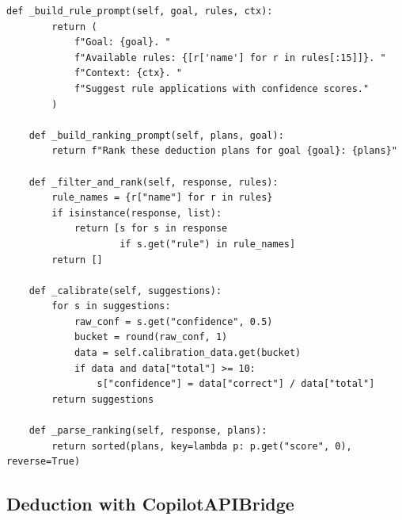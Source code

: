 \documentclass[11pt]{article}
\begin{document}
\begin{lstlisting}[style=jugeo-python,
  caption={Deduction hint generation via CopilotChannel},
  label={lst:dedhint}]
    def _build_rule_prompt(self, goal, rules, ctx):
        return (
            f"Goal: {goal}. "
            f"Available rules: {[r['name'] for r in rules[:15]]}. "
            f"Context: {ctx}. "
            f"Suggest rule applications with confidence scores."
        )

    def _build_ranking_prompt(self, plans, goal):
        return f"Rank these deduction plans for goal {goal}: {plans}"

    def _filter_and_rank(self, response, rules):
        rule_names = {r["name"] for r in rules}
        if isinstance(response, list):
            return [s for s in response
                    if s.get("rule") in rule_names]
        return []

    def _calibrate(self, suggestions):
        for s in suggestions:
            raw_conf = s.get("confidence", 0.5)
            bucket = round(raw_conf, 1)
            data = self.calibration_data.get(bucket)
            if data and data["total"] >= 10:
                s["confidence"] = data["correct"] / data["total"]
        return suggestions

    def _parse_ranking(self, response, plans):
        return sorted(plans, key=lambda p: p.get("score", 0), reverse=True)
\end{lstlisting}

\subsection{Deduction with CopilotAPIBridge}
\end{document}
